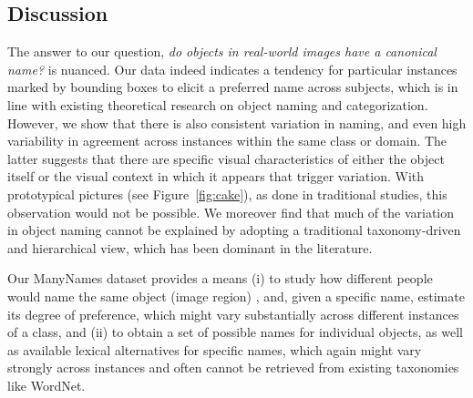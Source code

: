 
\subsection{Discussion}
\label{subsec:discuss}


The answer to our question, \textit{do objects in real-world images have a canonical name?} is nuanced. 
Our data indeed indicates a tendency for particular instances marked by bounding boxes to elicit a preferred name across subjects, which is in line with existing theoretical research on object naming and categorization. 
However, we show that there is also consistent variation in naming, and even high variability in agreement across instances within the same class or domain. 
The latter suggests that there are specific visual characteristics of either the object itself or the visual context in which it appears that trigger variation. With prototypical pictures (see Figure\ \ref{fig:cake}), as done in traditional studies, this observation would not be possible.
We moreover find that much of the variation in object naming cannot be explained by adopting a traditional taxonomy-driven and hierarchical view, which has been dominant in the literature.

Our ManyNames dataset provides a means 
(i) to study how different people would name the same object (image region) , and, given a specific name, estimate its degree of preference, which might vary substantially across different instances of a class, and   
(ii) to obtain a set of possible names for individual objects, as well as available lexical alternatives for specific names, which again might vary strongly across instances and often cannot be retrieved from existing taxonomies like WordNet. 

